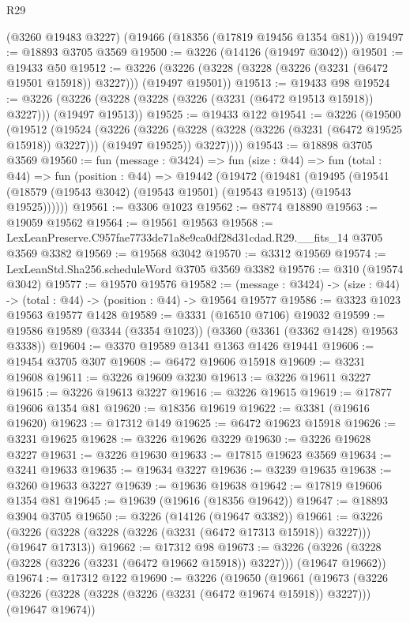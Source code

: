 \begin{lexlean}{R29}
\begin{coremodule}
    (@3260 @19483 @3227)
    (@19466 (@18356 (@17819 @19456 @1354 @81)))
@19497 := @18893 @3705 @3569
@19500 := @3226 (@14126 (@19497 @3042))
@19501 := @19433 @50
@19512 := @3226 (@3226 (@3228 (@3228 (@3226 (@3231 (@6472 @19501 @15918)) @3227))) (@19497 @19501))
@19513 := @19433 @98
@19524 := @3226 (@3226 (@3228 (@3228 (@3226 (@3231 (@6472 @19513 @15918)) @3227))) (@19497 @19513))
@19525 := @19433 @122
@19541 := @3226
    (@19500
      (@19512
        (@19524
          (@3226
            (@3226 (@3228 (@3228 (@3226 (@3231 (@6472 @19525 @15918)) @3227))) (@19497 @19525))
            @3227))))
@19543 := @18898 @3705 @3569
@19560 := fun (message : @3424) =>
  fun (size : @44) =>
  fun (total : @44) =>
  fun (position : @44) =>
  @19442
    (@19472
      (@19481
        (@19495 (@19541 (@18579 (@19543 @3042) (@19543 @19501) (@19543 @19513) (@19543 @19525))))))
@19561 := @3306 @1023
@19562 := @8774 @18890
@19563 := @19059 @19562
@19564 := @19561 @19563
@19568 := LexLeanPreserve.C957fae7733de71a8e9ca0df28d31cdad.R29.__fits_14 @3705 @3569 @3382
@19569 := @19568 @3042
@19570 := @3312 @19569
@19574 := LexLeanStd.Sha256.scheduleWord @3705 @3569 @3382
@19576 := @310 (@19574 @3042)
@19577 := @19570 @19576
@19582 := (message : @3424) -> (size : @44) -> (total : @44) -> (position : @44) -> @19564 @19577
@19586 := @3323 @1023 @19563 @19577 @1428
@19589 := @3331 (@16510 @7106) @19032
@19599 := @19586 @19589 (@3344 (@3354 @1023)) (@3360 (@3361 (@3362 @1428) @19563 @3338))
@19604 := @3370 @19589 @1341 @1363 @1426 @19441
@19606 := @19454 @3705 @307
@19608 := @6472 @19606 @15918
@19609 := @3231 @19608
@19611 := @3226 @19609 @3230
@19613 := @3226 @19611 @3227
@19615 := @3226 @19613 @3227
@19616 := @3226 @19615
@19619 := @17877 @19606 @1354 @81
@19620 := @18356 @19619
@19622 := @3381 (@19616 @19620)
@19623 := @17312 @149
@19625 := @6472 @19623 @15918
@19626 := @3231 @19625
@19628 := @3226 @19626 @3229
@19630 := @3226 @19628 @3227
@19631 := @3226 @19630
@19633 := @17815 @19623 @3569
@19634 := @3241 @19633
@19635 := @19634 @3227
@19636 := @3239 @19635
@19638 := @3260 @19633 @3227
@19639 := @19636 @19638
@19642 := @17819 @19606 @1354 @81
@19645 := @19639 (@19616 (@18356 @19642))
@19647 := @18893 @3904 @3705
@19650 := @3226 (@14126 (@19647 @3382))
@19661 := @3226 (@3226 (@3228 (@3228 (@3226 (@3231 (@6472 @17313 @15918)) @3227))) (@19647 @17313))
@19662 := @17312 @98
@19673 := @3226 (@3226 (@3228 (@3228 (@3226 (@3231 (@6472 @19662 @15918)) @3227))) (@19647 @19662))
@19674 := @17312 @122
@19690 := @3226
    (@19650
      (@19661
        (@19673
          (@3226
            (@3226 (@3228 (@3228 (@3226 (@3231 (@6472 @19674 @15918)) @3227))) (@19647 @19674))

\end{coremodule}
\end{lexlean}
